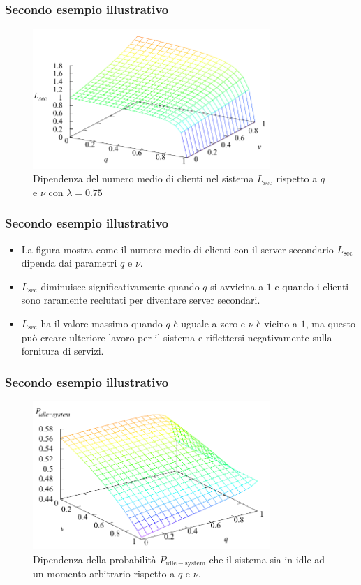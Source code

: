 \documentclass{beamer}
\begin{document}
\begin{frame}
    \frametitle{Secondo esempio illustrativo}
    \begin{figure}[h]
        \centering
        \includegraphics[width=0.8\textwidth]{0uFWo7C.png}
        \caption{ Dipendenza del numero medio di clienti nel sistema $L_{\mathrm{sec}}$ rispetto a $q$ e $\nu$ con $\lambda=0.75$}
    \end{figure}
\end{frame}


\begin{frame}
    \frametitle{Secondo esempio illustrativo}
    \begin{itemize}
        \item La figura mostra come il numero medio di clienti con il server secondario $L_\mathrm{sec}$ dipenda dai parametri $q$ e $\nu$.
        \item $L_\mathrm{sec}$ diminuisce significativamente quando $q$ si avvicina a $1$ e quando i clienti sono raramente reclutati per diventare server secondari.
        \item $L_\mathrm{sec}$ ha il valore massimo quando $q$ è uguale a zero e $\nu$ è vicino a $1$, ma questo può creare ulteriore lavoro per il sistema e riflettersi negativamente sulla fornitura di servizi.
    \end{itemize}
\end{frame}


\begin{frame}
    \frametitle{Secondo esempio illustrativo}
    \begin{figure}[h!]
        \centering
        \includegraphics[width=0.8\textwidth]{3zlg6uj.png}
        \caption{Dipendenza della probabilità $P_\mathrm{idle-system}$ che il sistema sia in idle ad un momento arbitrario rispetto a $q$ e $\nu$.}
    \end{figure}
\end{frame}
\end{document}
